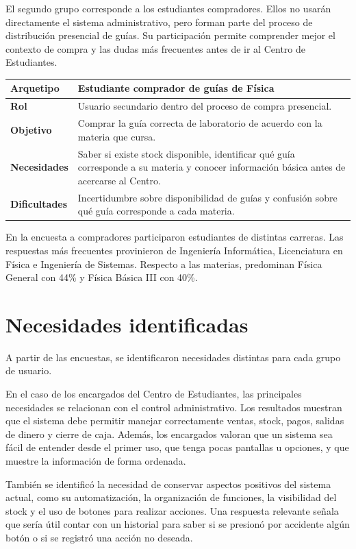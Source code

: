 \documentclass[12pt,letterpaper]{article}
\begin{document}
El segundo grupo corresponde a los estudiantes compradores. Ellos no usarán directamente el sistema administrativo, pero forman parte del proceso de distribución presencial de guías. Su participación permite comprender mejor el contexto de compra y las dudas más frecuentes antes de ir al Centro de Estudiantes.

\begin{center}
\begin{tabularx}{\textwidth}{|>{\bfseries}p{4cm}|X|}
\hline
Arquetipo & Estudiante comprador de guías de Física \\
\hline
Rol & Usuario secundario dentro del proceso de compra presencial. \\
\hline
Objetivo & Comprar la guía correcta de laboratorio de acuerdo con la materia que cursa. \\
\hline
Necesidades & Saber si existe stock disponible, identificar qué guía corresponde a su materia y conocer información básica antes de acercarse al Centro. \\
\hline
Dificultades & Incertidumbre sobre disponibilidad de guías y confusión sobre qué guía corresponde a cada materia. \\
\hline
\end{tabularx}
\end{center}

En la encuesta a compradores participaron estudiantes de distintas carreras. Las respuestas más frecuentes provinieron de Ingeniería Informática, Licenciatura en Física e Ingeniería de Sistemas. Respecto a las materias, predominan Física General con 44\% y Física Básica III con 40\%.

\section{Necesidades identificadas}

A partir de las encuestas, se identificaron necesidades distintas para cada grupo de usuario.

En el caso de los encargados del Centro de Estudiantes, las principales necesidades se relacionan con el control administrativo. Los resultados muestran que el sistema debe permitir manejar correctamente ventas, stock, pagos, salidas de dinero y cierre de caja. Además, los encargados valoran que un sistema sea fácil de entender desde el primer uso, que tenga pocas pantallas u opciones, y que muestre la información de forma ordenada.

También se identificó la necesidad de conservar aspectos positivos del sistema actual, como su automatización, la organización de funciones, la visibilidad del stock y el uso de botones para realizar acciones. Una respuesta relevante señala que sería útil contar con un historial para saber si se presionó por accidente algún botón o si se registró una acción no deseada.
\end{document}
